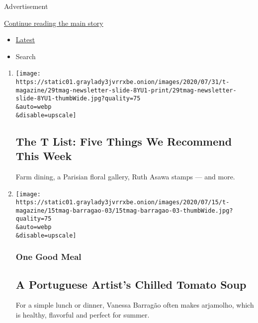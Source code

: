 Advertisement

\protect\hyperlink{after-mid1}{Continue reading the main story}

\begin{itemize}
\tightlist
\item
  \protect\hyperlink{stream-panel}{Latest}
\item
  Search
\end{itemize}

\begin{enumerate}
\def\labelenumi{\arabic{enumi}.}
\item
  \href{/2020/07/30/t-magazine/the-t-list-five-things-we-recommend-this-week.html}{}

  \texttt{[image: https://static01.graylady3jvrrxbe.onion/images/2020/07/31/t-magazine/29tmag-newsletter-slide-8YU1-print/29tmag-newsletter-slide-8YU1-thumbWide.jpg?quality=75\\\&auto=webp\\\&disable=upscale]}

  \hypertarget{the-t-list-five-things-we-recommend-this-week}{%
  \subsection{The T List: Five Things We Recommend This
  Week}\label{the-t-list-five-things-we-recommend-this-week}}

  Farm dining, a Parisian floral gallery, Ruth Asawa stamps --- and
  more.
\item
  \href{/2020/07/17/t-magazine/summer-recipes-arjamolho-soup-vanessa-barragao.html}{}

  \texttt{[image: https://static01.graylady3jvrrxbe.onion/images/2020/07/15/t-magazine/15tmag-barragao-03/15tmag-barragao-03-thumbWide.jpg?quality=75\\\&auto=webp\\\&disable=upscale]}

  \hypertarget{one-good-meal-5}{%
  \subsubsection{One Good Meal}\label{one-good-meal-5}}

  \hypertarget{a-portuguese-artists-chilled-tomato-soup}{%
  \subsection{A Portuguese Artist's Chilled Tomato
  Soup}\label{a-portuguese-artists-chilled-tomato-soup}}

  For a simple lunch or dinner, Vanessa Barragão often makes arjamolho,
  which is healthy, flavorful and perfect for summer.


\end{enumerate}

